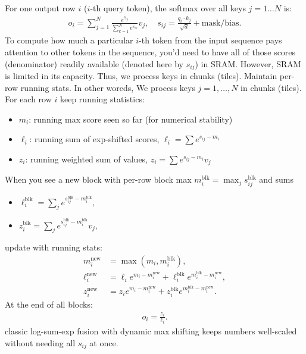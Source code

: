 For one output row $i$ ($i$-th query token), the softmax over all keys $j=1\ldots N$ is:
\begin{align*}
	o_i = \sum_{j=1}^N \frac{e^{s_{ij}}}{\sum_{k=1}^N e^{s_{ik}}} v_j,
	\quad s_{ij} = \frac{q_i\cdot k_j}{\sqrt{d}} + \text{mask/bias}.
\end{align*}
To compute how much a particular $i$-th token from the input sequence pays attention to other tokens in the sequence,  you'd need to have all of those scores (\ie denominator) readily available (denoted here by $s_{ij}$) in SRAM. However, SRAM is limited in its capacity. Thus, we process keys in chunks (\ie tiles). Maintain per-row running stats. In other woreds, We process keys $j=1,\dots,N$ in chunks (tiles). For each row $i$ keep running statistics:
\begin{itemize}
	\item $m_i$: running max score seen so far (for numerical stability)
	\item $\ell_i$: running sum of exp-shifted scores, \ie $\ell_i = \sum e^{s_{ij}-m_i}$
	\item $z_i$: running weighted sum of values, $z_i = \sum e^{s_{ij}-m_i} v_j$
\end{itemize}
When you see a new block with per-row block max $m_i^{\text{blk}}=\max_j s_{ij}^{\text{blk}}$ and sums
\begin{itemize}
	\item $\ell_i^{\text{blk}} = \sum_j e^{s_{ij}^{\text{blk}}-m_i^{\text{blk}}},$
	\item $z_i^{\text{blk}} = \sum_j e^{s_{ij}^{\text{blk}}-m_i^{\text{blk}}} v_j,$
\end{itemize}
update with running stats:
\begin{align*}
	m_i^{\text{new}} &= \max(m_i, m_i^{\text{blk}}),\\
	\ell_i^{\text{new}} &= \ell_i e^{m_i - m_i^{\text{new}}}
	+
	\ell_i^{\text{blk}} e^{m_i^{\text{blk}} - m_i^{\text{new}}},\\
	z_i^{\text{new}} &= z_i e^{m_i - m_i^{\text{new}}}
	+
	z_i^{\text{blk}} e^{m_i^{\text{blk}} - m_i^{\text{new}}}.
\end{align*}
At the end of all blocks:
\begin{align*}
	o_i = \frac{z_i}{\ell_i}.
\end{align*}
classic log-sum-exp fusion with dynamic max shifting keeps numbers well-scaled without needing all $s_{ij}$ at once.


